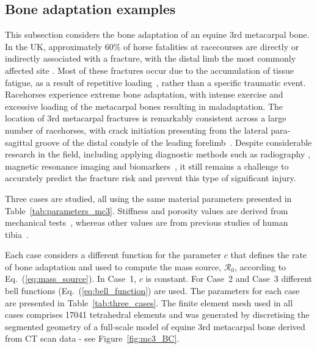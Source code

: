 \documentclass[review]{elsarticle}
\numberwithin{equation}{section}
\begin{document}
\subsection{Bone adaptation examples}
\label{sec:numerical_examples:bone_adap}
This subsection considers the bone adaptation of an equine 3rd metacarpal bone. 
In the UK, approximately 60\% of horse fatalities at racecourses are directly or indirectly associated with a fracture, with the distal limb the most commonly affected site \citep{parkin2004risk}.
Most of these fractures occur due to the accumulation of tissue fatigue, as a result of repetitive loading~\citep{Parkin2005}, rather than a specific traumatic event. 
Racehorses experience extreme bone adaptation, with intense exercise and excessive loading of the metacarpal bones resulting in maladaptation. 
The location of 3rd metacarpal fractures is remarkably consistent across a large number of racehorses,  with crack initiation presenting from 
the lateral para-sagittal groove of the distal condyle of the leading forelimb~\citep{jacklin2012frequency, parkin2006analysis}.
Despite considerable research in the field, including applying diagnostic methods such as radiography 
\citep{bogers2016quantitative, crijns2014intramodality, loughridge2017qualitative}, magnetic resonance imaging 
\citep{tranquille2017MRI} and biomarkers~\citep{mcilwraith2005use}, it still remains a challenge to accurately predict the fracture risk 
and prevent this type of significant injury.

Three cases are studied, all using the same material parameters presented in Table~\ref{tab:parameters_mc3}.
Stiffness and porosity values are derived from mechanical tests~\citep{Les1994}, whereas other values are from previous studies of human tibia~\citep{Pang2012,Waffenschmidt2012}. 

Each case considers a different function for the parameter $c$ that defines the rate of bone adaptation and used to compute the mass source, $\mathcal{R}_0$, according to Eq.~(\ref{eq:mass_source}).
In Case~1, $c$ is constant. For Case~2 and Case~3 different bell functions (Eq.~(\ref{eq:bell_function}) are used. The parameters for each case are presented in Table~\ref{tab:three_cases}. 
The finite element mesh used in all cases comprises 17041 tetrahedral elements and was generated by discretising the segmented geometry of a full-scale model of equine 3rd metacarpal bone derived from CT scan data - see Figure~\ref{fig:mc3_BC}.
\end{document}

